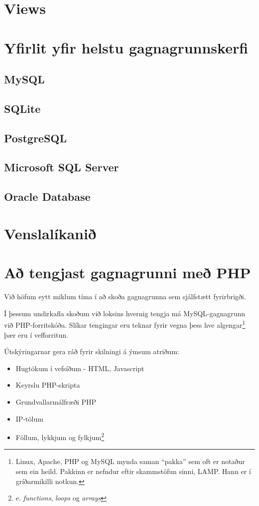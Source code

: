 \section{Views}
\section{Yfirlit yfir helstu gagnagrunnskerfi}
\label{undirkafli:helstu-gagnagrunnskerfi}
\subsection{MySQL}
\subsection{SQLite}
\subsection{PostgreSQL}
\subsection{Microsoft SQL Server}
\subsection{Oracle Database}
\section{Venslalíkanið}
\section{Að tengjast gagnagrunni með PHP}
Við höfum eytt miklum tíma í að skoða gagnagrunna sem sjálfstætt fyrirbrigði.

Í þessum undirkafla skoðum við loksins hvernig tengja má MySQL-gagnagrunn við PHP-forritskóða.
Slíkar tengingar eru teknar fyrir vegna þess hve algengar\footnote{Linux, Apache, PHP og MySQL mynda saman ``pakka'' sem oft er notaður sem ein heild. Pakkinn er nefndur eftir skammstöfun sinni, LAMP. Hann er í gríðarmikilli notkun.} þær eru í vefforritun.

Útskýringarnar gera ráð fyrir skilningi á ýmsum atriðum:
\begin{itemize}
 \item Hugtökum í vefsíðum - HTML, Javascript
 \item Keyrslu PHP-skripta
 \item Grundvallarmálfræði PHP
 \item IP-tölum
 \item Föllum, lykkjum og fylkjum\footnote{e. \emph{functions}, \emph{loops} og \emph{arrays}}
\end{itemize}
